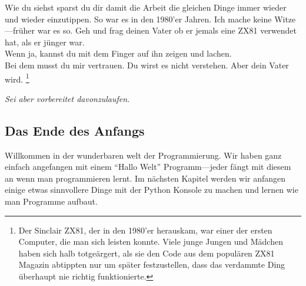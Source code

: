 Wie du siehst sparst du dir damit die Arbeit die gleichen Dinge immer wieder und wieder einzutippen. So war es in den 1980'er Jahren. Ich mache keine Witze---früher war es so. Geh und frag deinen Vater ob er jemals eine ZX81 verwendet hat, als er jünger war.\\

\noindent
Wenn ja, kannst du mit dem Finger auf ihn zeigen und lachen.\\

\noindent
Bei dem musst du mir vertrauen. Du wirst es nicht verstehen. Aber dein Vater wird. \footnote{Der Sinclair ZX81, der in den 1980'er herauskam, war einer der ersten Computer, die man sich leisten konnte. Viele junge Jungen und Mädchen haben sich halb totgeärgert, als sie den Code aus dem populären ZX81 Magazin abtippten nur um später festzustellen, dass das verdammte Ding überhaupt nie richtig funktionierte.}


\noindent
\emph{Sei aber vorbereitet davonzulaufen.}

\subsection*{\color{BrickRed}Das Ende des Anfangs}

Willkommen in der wunderbaren welt der Programmierung. Wir haben ganz einfach angefangen mit einem ``Hallo Welt'' Programm---jeder fängt mit diesem an wenn man programmieren lernt.
Im nächsten Kapitel werden wir anfangen einige etwas sinnvollere Dinge mit der Python Konsole zu machen und lernen wie man Programme aufbaut.

\newpage
